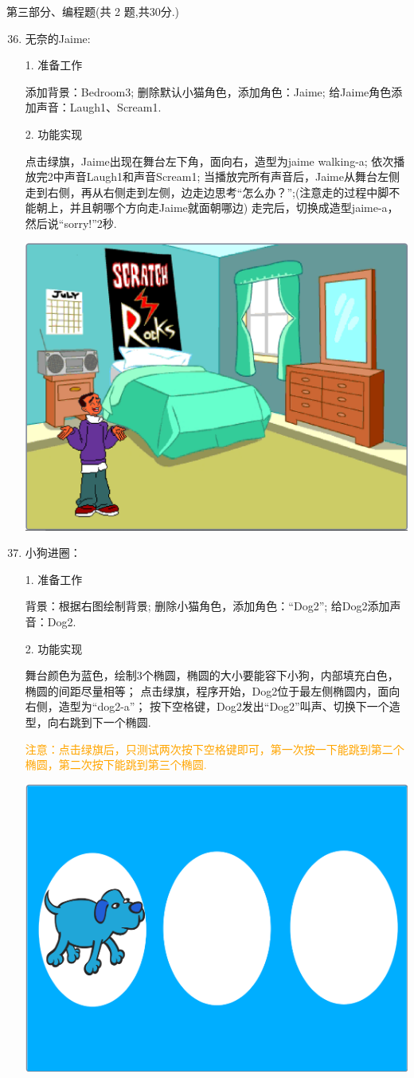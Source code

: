 \documentclass[10pt, a4paper]{article}
\begin{document}
    {\noindent\heiti 第三部分、编程题(共 2 题,共30分.)}
    \begin{enumerate}
        \setcounter{enumi}{35}
        
        \item 无奈的Jaime:
        
        1. 准备工作
        \begin{tasks}[label = (\arabic*)]
            \task 添加背景：Bedroom3;
            \task 删除默认小猫角色，添加角色：Jaime;
            \task 给Jaime角色添加声音：Laugh1、Scream1.
        \end{tasks}
        2. 功能实现
        \begin{tasks}[label = (\arabic*)]
            \task 点击绿旗，Jaime出现在舞台左下角，面向右，造型为jaime walking-a;
            \task 依次播放完2中声音Laugh1和声音Scream1;
            \task 当播放完所有声音后，Jaime从舞台左侧走到右侧，再从右侧走到左侧，边走边思考“怎么办？”;(注意走的过程中脚不能朝上，并且朝哪个方向走Jaime就面朝哪边)
            \task 走完后，切换成造型jaime-a，然后说“sorry!”2秒.
        \end{tasks}
        \begin{center}
            \includegraphics[width=.3\textwidth]{36.png}
        \end{center}

        \item 小狗进圈：
        
        1. 准备工作
        \begin{tasks}[label = (\arabic*)]
            \task 背景：根据右图绘制背景;
            \task 删除小猫角色，添加角色：“Dog2”;
            \task 给Dog2添加声音：Dog2.
        \end{tasks}
        2. 功能实现
        \begin{tasks}[label = (\arabic*)]
            \task 舞台颜色为蓝色，绘制3个椭圆，椭圆的大小要能容下小狗，内部填充白色，椭圆的间距尽量相等；
            \task 点击绿旗，程序开始，Dog2位于最左侧椭圆内，面向右侧，造型为“dog2-a”；
            \task 按下空格键，Dog2发出“Dog2”叫声、切换下一个造型，向右跳到下一个椭圆.
            
            \textcolor{orange}{注意：点击绿旗后，只测试两次按下空格键即可，第一次按一下能跳到第二个椭圆，第二次按下能跳到第三个椭圆.}
        \end{tasks}
        \begin{center}
            \includegraphics[width=.3\textwidth]{37.png}
        \end{center}
    \end{enumerate}
\end{document}
